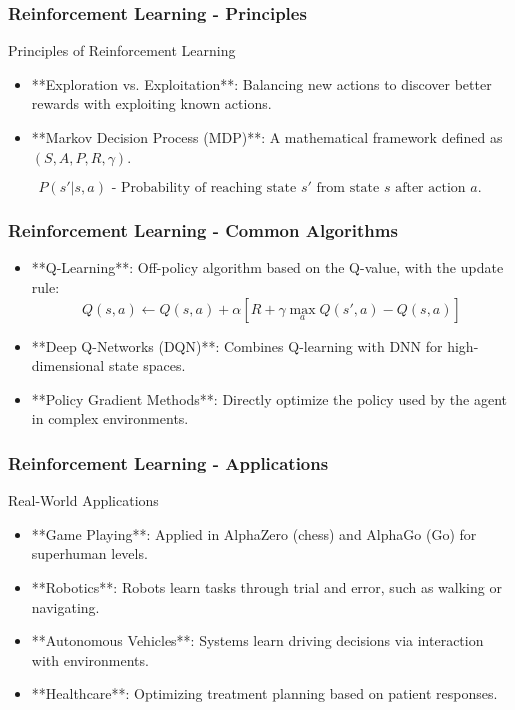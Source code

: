 \documentclass[aspectratio=169]{beamer}
\begin{document}
\begin{frame}[fragile]
    \frametitle{Reinforcement Learning - Principles}
    \begin{block}{Principles of Reinforcement Learning}
        \begin{itemize}
            \item **Exploration vs. Exploitation**: Balancing new actions to discover better rewards with exploiting known actions.
            \item **Markov Decision Process (MDP)**: A mathematical framework defined as \( (S, A, P, R, \gamma) \).
        \end{itemize}
        \begin{equation}
            P(s' | s, a) \text{ - Probability of reaching state } s' \text{ from state } s \text{ after action } a.
        \end{equation}
    \end{block}
\end{frame}

\begin{frame}[fragile]
    \frametitle{Reinforcement Learning - Common Algorithms}
    \begin{itemize}
        \item **Q-Learning**: Off-policy algorithm based on the Q-value, with the update rule:
        \begin{equation}
            Q(s, a) \leftarrow Q(s, a) + \alpha \left[ R + \gamma \max_a Q(s', a) - Q(s, a) \right]
        \end{equation}
        
        \item **Deep Q-Networks (DQN)**: Combines Q-learning with DNN for high-dimensional state spaces.
        
        \item **Policy Gradient Methods**: Directly optimize the policy used by the agent in complex environments.
    \end{itemize}
\end{frame}

\begin{frame}[fragile]
    \frametitle{Reinforcement Learning - Applications}
    \begin{block}{Real-World Applications}
        \begin{itemize}
            \item **Game Playing**: Applied in AlphaZero (chess) and AlphaGo (Go) for superhuman levels.
            \item **Robotics**: Robots learn tasks through trial and error, such as walking or navigating.
            \item **Autonomous Vehicles**: Systems learn driving decisions via interaction with environments.
            \item **Healthcare**: Optimizing treatment planning based on patient responses.
        \end{itemize}
    \end{block}
\end{frame}
\end{document}
